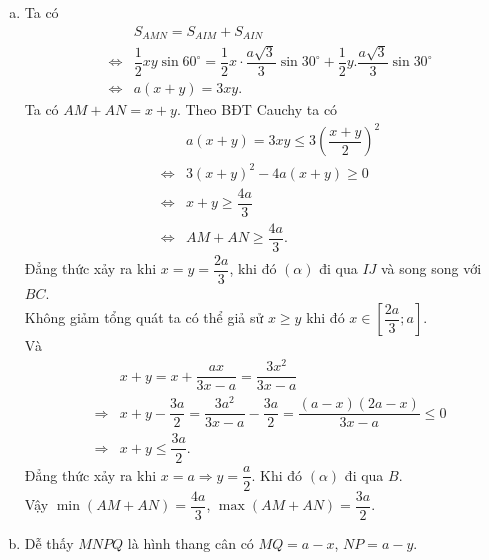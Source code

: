 \begin{ex}
{\begin{enumerate}[a)]
			Tương tự $MQ\parallel IJ$ nên  $MNPQ$ là hình thang.\\
			 Dễ thấy $DQ=AM=x$, $DP=AN=y$.\\
			Theo định lí cô sinta có 
			 $MN^2=AM^2+AN^2-2AM.AN\cos{60^\circ}=x^2+y^2-xy$.\\
			Tương tự $PQ^2=DP^2+DQ^2-2DP.DQ\cos{60^\circ}=x^2+y^2-xy\Rightarrow  MN=PQ$.\\
			 Vậy $MNPQ$ là hình thang cân.\\
			Trường hợp $BC$, $MN$, $PQ$ song song không có gì khó khăn  bạn đọc tự kiểm tra.
			\item Ta  có
			\begin{eqnarray*}
				 &&S_{AMN}=S_{AIM}+S_{AIN}\\
				 &\Leftrightarrow&\dfrac{1}{2}xy\sin{60^\circ}=\dfrac{1}{2}x\cdot\dfrac{a\sqrt{3}}{3}\sin{30^\circ}+\dfrac{1}{2}y.\dfrac{a\sqrt{3}}{3}\sin{30^\circ}\\
				&\Leftrightarrow&a\left(x+y\right)=3xy. 
			\end{eqnarray*}
			Ta có $AM+AN=x+y$. Theo  BĐT Cauchy ta có
			\begin{eqnarray*}
				 &&a\left(x+y\right)=3xy\le 3\left(\dfrac{x+y}{2}\right)^2\\
				&\Leftrightarrow&3\left(x+y\right)^2-4a\left(x+y\right)\ge 0\\ 
				&\Leftrightarrow&x+y\ge \dfrac{4a}{3}\\ 
				&\Leftrightarrow&AM+AN\ge  \dfrac{4a}{3}.
			\end{eqnarray*}
			Đẳng thức xảy ra khi  $x=y=\dfrac{2a}{3}$, khi đó $(\alpha)$ đi qua $IJ$ và song song với $BC$.\\
			Không giảm tổng quát ta có thể giả sử $x\ge y$ khi đó $x\in  [\dfrac{2a}{3};a]$.\\
			Và 
			\begin{eqnarray*}
				 &&x+y=x+\dfrac{ax}{3x-a}=\dfrac{3x^2}{3x-a}\\
				&\Rightarrow&x+y-\dfrac{3a}{2}=\dfrac{3a^2}{3x-a}-\dfrac{3a}{2}=\dfrac{\left(a-x\right)\left(2a-x\right)}{3x-a}\le 0\\ 
				&\Rightarrow&x+y\le \dfrac{3a}{2}. 
			\end{eqnarray*}
			Đẳng thức xảy ra khi $x=a\Rightarrow y=\dfrac{a}{2}$. Khi  đó $(\alpha)$ đi qua $B$.\\
			Vậy $\min \left(AM+AN\right)=\dfrac{4a}{3}$,  $\max \left(AM+AN\right)=\dfrac{3a}{2}$.
			\item 
			Dễ thấy $MNPQ$ là hình  thang cân có $MQ=a-x$, $NP=a-y$.\\

\end{enumerate}}
\end{ex}
